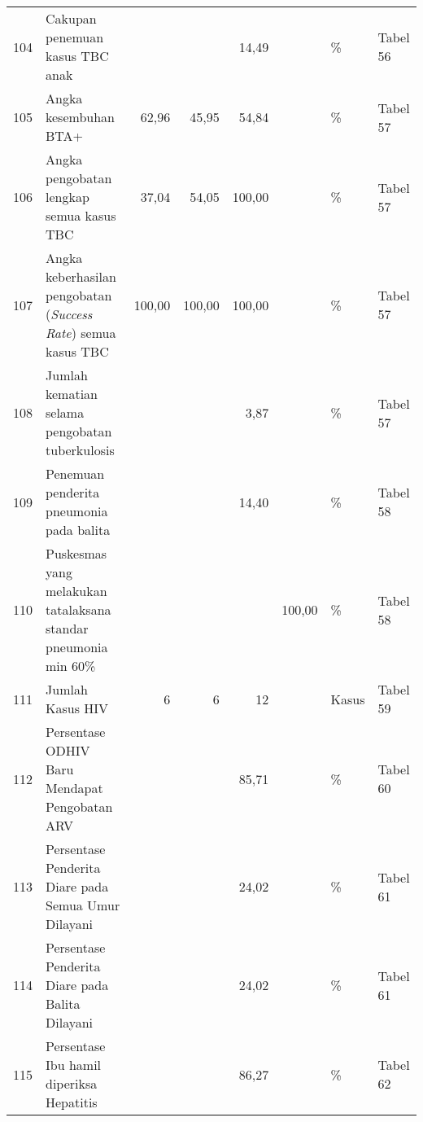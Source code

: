 \begin{small}
\begin{longtable}{rY{12em}rrrrY{5em}Y{5em}}
	104 & Cakupan penemuan kasus TBC anak                                             &        &        &              14,49 &          & \%                             & Tabel 56 \\
	105 & Angka kesembuhan BTA+                                                       &  62,96 &  45,95 &              54,84 &          & \%                             & Tabel 57 \\
	106 & Angka pengobatan lengkap semua kasus TBC                                    &  37,04 &  54,05 &             100,00 &          & \%                             & Tabel 57 \\
	107 & Angka keberhasilan pengobatan (\emph{Success Rate}) semua kasus TBC         & 100,00 & 100,00 &             100,00 &          & \%                             & Tabel 57 \\
	108 & Jumlah kematian selama pengobatan tuberkulosis                              &        &        &               3,87 &          & \%                             & Tabel 57 \\
	109 & Penemuan penderita pneumonia pada balita                                    &        &        &              14,40 &          & \%                             & Tabel 58 \\
	110 & Puskesmas yang melakukan tatalaksana standar pneumonia min 60\%             &        &        &                    &   100,00 & \%                             & Tabel 58 \\
	111 & Jumlah Kasus HIV                                                            &      6 &      6 &                 12 &          & Kasus                          & Tabel 59 \\
	112 & Persentase ODHIV Baru Mendapat Pengobatan ARV                               &        &        &              85,71 &          & \%                             & Tabel 60 \\
	113 & Persentase Penderita Diare pada Semua Umur Dilayani                         &        &        &              24,02 &          & \%                             & Tabel 61 \\
	114 & Persentase Penderita Diare pada Balita Dilayani                             &        &        &              24,02 &          & \%                             & Tabel 61 \\
	115 & Persentase Ibu hamil diperiksa Hepatitis                                    &        &        &              86,27 &          & \%                             & Tabel 62 \\

\end{longtable}
\end{small}
